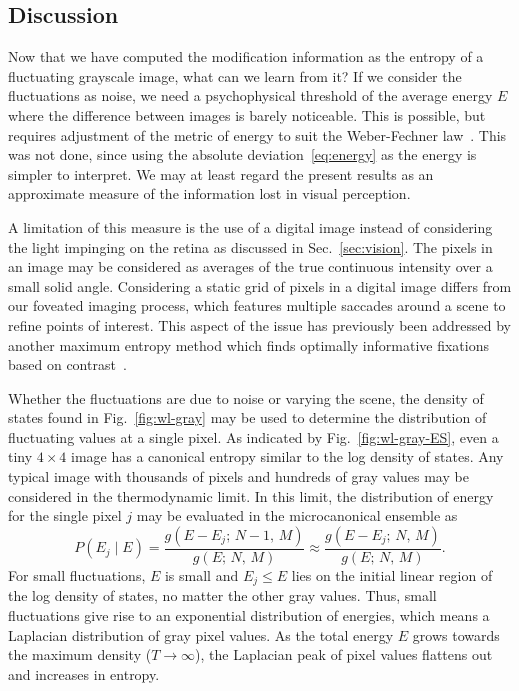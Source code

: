 \documentclass[aps,reprint,floatfix]{revtex4-2}
\theoremstyle{plain}
\theoremstyle{definition}
\renewcommand\leq\leqslant%
\begin{document}
\subsection{Discussion}\label{sec:wl-discussion}

Now that we have computed the modification information as the entropy of a
fluctuating grayscale image, what can we learn from it? If we consider the
fluctuations as noise, we need a psychophysical threshold of the average energy
$E$ where the difference between images is barely noticeable. This is possible,
but requires adjustment of the metric of energy to suit the Weber-Fechner
law~\cite{jnd}. This was not done, since using the absolute
deviation~\eqref{eq:energy} as the energy is simpler to interpret. We may at
least regard the present results as an approximate measure of the information
lost in visual perception.

A limitation of this measure is the use of a digital image instead of
considering the light impinging on the retina as discussed in
Sec.~\ref{sec:vision}. The pixels in an image may be considered as averages of
the true continuous intensity over a small solid angle. Considering a static
grid of pixels in a digital image differs from our foveated imaging process,
which features multiple saccades around a scene to refine points of interest.
This aspect of the issue has previously been addressed by another maximum
entropy method which finds optimally informative fixations based on
contrast~\cite{contrast-entropy}.

Whether the fluctuations are due to noise or varying the scene, the density of
states found in Fig.~\ref{fig:wl-gray} may be used to determine the distribution
of fluctuating values at a single pixel. As indicated by
Fig.~\ref{fig:wl-gray-ES}, even a tiny $4 \times 4$ image has a canonical
entropy similar to the log density of states. Any typical image with thousands
of pixels and hundreds of gray values may be considered in the thermodynamic
limit. In this limit, the distribution of energy for the single pixel $j$ may be
evaluated in the microcanonical ensemble as
\[
  P(E_j \mathbin{|} E)
  = \frac{g(E - E_j;\, N - 1,\, M)}{g(E;\, N,\, M)}
  \approx \frac{g(E - E_j;\, N,\, M)}{g(E;\, N,\, M)}.
\]
For small fluctuations, $E$ is small and $E_j \leq E$ lies on the initial linear
region of the log density of states, no matter the other gray values. Thus,
small fluctuations give rise to an exponential distribution of energies, which
means a Laplacian distribution of gray pixel values. As the total energy $E$
grows towards the maximum density ($T \to \infty$), the Laplacian peak of pixel
values flattens out and increases in entropy.
\end{document}
